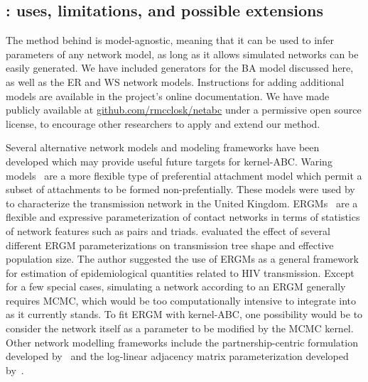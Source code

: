 \subsection{: uses, limitations, and possible extensions}

The method behind  is model-agnostic, meaning that it can be
used to infer parameters of any network model, as long as it allows simulated
networks can be easily generated. We have included generators for the \gls{BA}
model discussed here, as well as the \gls{ER} and \gls{WS} network models.
Instructions for adding additional models are available in the project's online
documentation. We have made  publicly available at
\url{github.com/rmcclosk/netabc} under a permissive open source license, to
encourage other researchers to apply and extend our method.

Several alternative network models and modeling frameworks have been developed
which may provide useful future targets for kernel-\gls{ABC}. Waring
models~\autocite{irwin1963place,handcock2004likelihood} are a more flexible
type of preferential attachment model which permit a subset of attachments to
be formed non-prefentially. These models were used by
\textcite{brown2011transmission} to characterize the transmission network in
the United Kingdom. \Glspl{ERGM}~\autocite{robins2007introduction} are a
flexible and expressive parameterization of contact networks in terms of
statistics of network features such as pairs and triads.
\textcite{goodreau2007assessing} evaluated the effect of several different
\gls{ERGM} parameterizations on transmission tree shape and effective
population size. The author suggested the use of \glspl{ERGM} as a general
framework for estimation of epidemiological quantities related to \gls{HIV}
transmission. Except for a few special cases, simulating a network according to
an \gls{ERGM} generally requires \gls{MCMC}, which would be too computationally
intensive to integrate into  as it currently stands. To fit
\gls{ERGM} with kernel-\gls{ABC}, one possibility would be to consider the
network itself as a parameter to be modified by the \gls{MCMC} kernel.
Other network modelling frameworks include the partnership-centric formulation
developed by~\textcite{eames2002modeling} and the log-linear adjacency matrix
parameterization developed by~\textcite{morriz1993epidemiology}.



